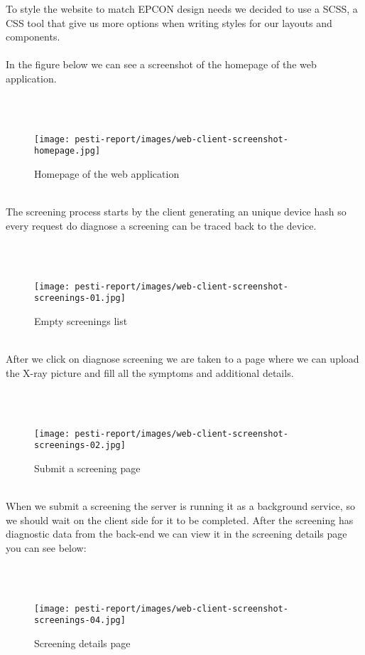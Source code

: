 To style the website to match EPCON design needs we decided to use a SCSS, a CSS tool that give us more options when writing styles for our layouts and components.
\\ \\
In the figure below we can see a screenshot of the homepage of the web application.

\\ \\
\begin{figure}[H]
	\centering
	\texttt{[image: pesti-report/images/web-client-screenshot-homepage.jpg]}
	\caption{Homepage of the web application}
	\label{fig:web-client-screenshot-homepage}
\end{figure}
\\

The screening process starts by the client generating an unique device hash so every request do diagnose a screening can be traced back to the device.

\\ \\
\begin{figure}[H]
	\centering
	\texttt{[image: pesti-report/images/web-client-screenshot-screenings-01.jpg]}
	\caption{Empty screenings list}
	\label{fig:web-client-screenshot-screenings-01}
\end{figure}
\\

After we click on diagnose screening we are taken to a page where we can upload the X-ray picture and fill all the symptoms and additional details.

\\ \\
\begin{figure}[H]
	\centering
	\texttt{[image: pesti-report/images/web-client-screenshot-screenings-02.jpg]}
	\caption{Submit a screening page}
	\label{fig:web-client-screenshot-screenings-02}
\end{figure}
\\

When we submit a screening the server is running it as a background service, so we should wait on the client side for it to be completed. After the screening has diagnostic data from the back-end we can view it in the screening details page you can see below:

\\ \\
\begin{figure}[H]
	\centering
	\texttt{[image: pesti-report/images/web-client-screenshot-screenings-04.jpg]}
	\caption{Screening details page}
	\label{fig:web-client-screenshot-screenings-04}
\end{figure}
\\



